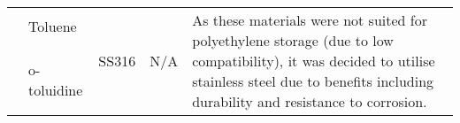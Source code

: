 {\begin{tabular}{@{}lp{5cm}p{2cm}p{2cm}p{12cm}@{}}
                                                      & Toluene                                                & \multirow[t]{5}{=}{SS316}                                                                 & \multirow[t]{5}{=}{N/A}                              & \multirow[t]{5}{=}{As these materials were not suited for polyethylene storage (due to low compatibility), it was decided to utilise stainless steel due to benefits including durability and resistance to corrosion.}                                                                                                                                                                                                                                                                                                                                                                                                                                                                                                                                                                                                                                                                                                \\ \cmidrule(l){2-2}
                                                      & o-toluidine                                            &                                                                                        &                                                   &                                                                                                                                                                                                                                                                                                                                                                                                                                                                                                                                                                                                                                                                                                                                                                                                                                                                                                                    \\ \cmidrule(l){2-2}

\end{tabular}}
